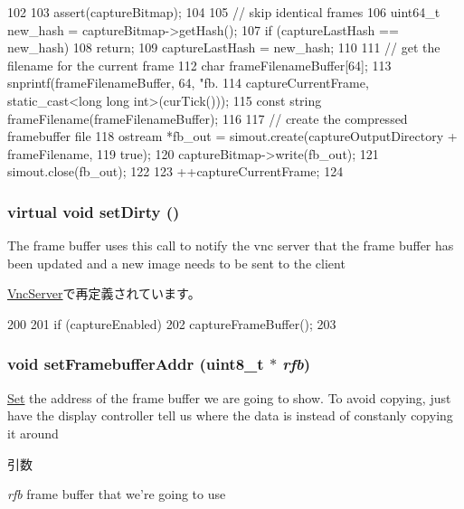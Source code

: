 \begin{DoxyCode}
102 {
103     assert(captureBitmap);
104 
105     // skip identical frames
106     uint64_t new_hash = captureBitmap->getHash();
107     if (captureLastHash == new_hash)
108         return;
109     captureLastHash = new_hash;
110 
111     // get the filename for the current frame
112     char frameFilenameBuffer[64];
113     snprintf(frameFilenameBuffer, 64, "fb.%
114             captureCurrentFrame, static_cast<long long int>(curTick()));
115     const string frameFilename(frameFilenameBuffer);
116 
117     // create the compressed framebuffer file
118     ostream *fb_out = simout.create(captureOutputDirectory + frameFilename,
119                     true);
120     captureBitmap->write(fb_out);
121     simout.close(fb_out);
122 
123     ++captureCurrentFrame;
124 }
\end{DoxyCode}
\hypertarget{classVncInput_ad7eac728ea55298c7691e7d1c165719b}{
\subsubsection[{setDirty}]{\setlength{\rightskip}{0pt plus 5cm}virtual void setDirty ()}}
\label{classVncInput_ad7eac728ea55298c7691e7d1c165719b}
The frame buffer uses this call to notify the vnc server that the frame buffer has been updated and a new image needs to be sent to the client 

\hyperlink{classVncServer_a92a590790db6444ca7a79eaf5fbcb0d9}{VncServer}で再定義されています。


\begin{DoxyCode}
200     {
201         if (captureEnabled)
202             captureFrameBuffer();
203     }
\end{DoxyCode}
\hypertarget{classVncInput_a54024497bf1e639ca5a4534d43329c0d}{
\subsubsection[{setFramebufferAddr}]{\setlength{\rightskip}{0pt plus 5cm}void setFramebufferAddr (uint8\_\-t $\ast$ {\em rfb})}}
\label{classVncInput_a54024497bf1e639ca5a4534d43329c0d}
\hyperlink{classSet}{Set} the address of the frame buffer we are going to show. To avoid copying, just have the display controller tell us where the data is instead of constanly copying it around 
\begin{DoxyParams}{引数}
\item[{\em rfb}]frame buffer that we're going to use \end{DoxyParams}



